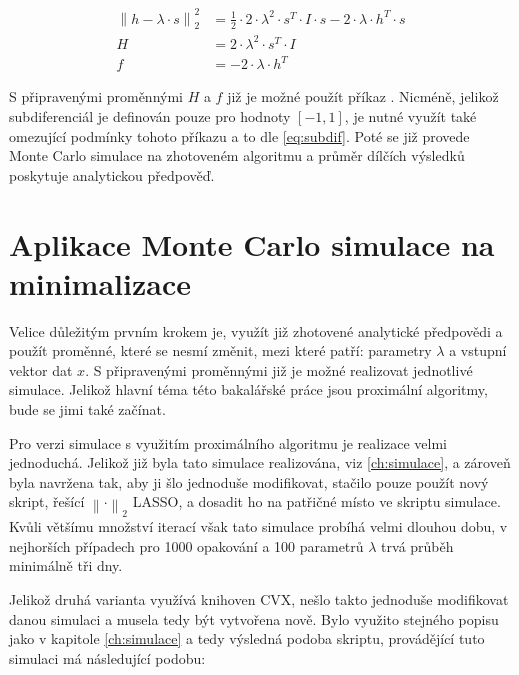 \documentclass[FM,BP]{tulthesis}
\newcounter{Vzorce}
\begin{document}
\begin{equation} \label{eq:quad} \tag{Vzorec \theVzorce}
\begin{split}
\left\| h - \lambda \cdot s\right\|_{2}^{2}  & = \frac{1}{2} \cdot 2 \cdot \lambda^{2} \cdot s^{T} \cdot I \cdot s - 2 \cdot \lambda \cdot h^{T} \cdot s\\
H & = 2 \cdot \lambda^{2} \cdot s^{T} \cdot I\\
f & = - 2 \cdot \lambda \cdot h^{T}
\end{split}
\end{equation}

S připravenými proměnnými $H$ a $f$ již je možné použít příkaz . Nicméně, jelikož subdiferenciál je definován pouze pro hodnoty $[-1, 1]$, je nutné využít také omezující podmínky tohoto příkazu a to dle \ref{eq:subdif}. Poté se již provede Monte Carlo simulace na zhotoveném algoritmu a průměr dílčích výsledků poskytuje analytickou předpověď. 

\section{Aplikace Monte Carlo simulace na minimalizace}
\label{subch:l2Sim}
Velice důležitým prvním krokem je, využít již zhotovené analytické předpovědi a použít proměnné, které se nesmí změnit, mezi které patří: parametry $\lambda$ a vstupní vektor dat $x$. S připravenými proměnnými již je možné realizovat jednotlivé simulace. Jelikož hlavní téma této bakalářské práce jsou proximální algoritmy, bude se jimi také začínat.

Pro verzi simulace s využitím proximálního algoritmu je realizace velmi jednoduchá. Jelikož již byla tato simulace realizována, viz \ref{ch:simulace}, a zároveň byla navržena tak, aby ji šlo jednoduše modifikovat, stačilo pouze použít nový skript, řešící $\left\| \cdot \right\|_{2} $ LASSO, a dosadit ho na patřičné místo ve skriptu simulace. Kvůli většímu množství iterací však tato simulace probíhá velmi dlouhou dobu, v nejhorších případech pro 1000 opakování a 100 parametrů $\lambda$ trvá průběh minimálně tři dny.

Jelikož druhá varianta využívá knihoven CVX, nešlo takto jednoduše modifikovat danou simulaci a musela tedy být vytvořena nově. Bylo využito stejného popisu jako v kapitole \ref{ch:simulace} a tedy výsledná podoba skriptu, provádějící tuto simulaci má následující podobu: 
\end{document}

